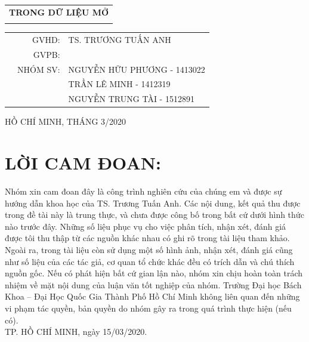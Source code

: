 \documentclass[11pt,a4paper]{article}
\begin{document}
\begin{titlepage}
\begin{center}
\begin{tabular}{c}
    \textbf{{\Huge TRONG DỮ LIỆU MỞ}}\\
	\\
    \hline
\end{tabular}
\end{center}

\vspace{3cm}

\begin{table}[h]
\begin{tabular}{rrl}
\hspace{5 cm} & GVHD: &TS. TRƯƠNG TUẤN ANH\\
& GVPB: & \\
& NHÓM SV: & NGUYỄN HỮU PHƯƠNG - 1413022\\
&   & TRẦN LÊ MINH - 1412319\\
&   & NGUYỄN TRUNG TÀI - 1512891 
\end{tabular}
\end{table}

\vspace{2cm}

\begin{center}
{\footnotesize HỒ CHÍ MINH, THÁNG 3/2020}
\end{center}
\end{titlepage}


\newpage
\section{LỜI CAM ĐOAN:}
Nhóm xin cam đoan đây là công trình nghiên cứu của chúng em và được sự hướng dẫn khoa học của TS. Trương Tuấn Anh. Các nội dung, kết quả thu được trong đề tài này là trung thực, và chưa được công bố trong bất cứ dưới hình thức nào trước đây. Những số liệu phục vụ cho việc phân tích, nhận xét, đánh giá được tôi thu thập từ các nguồn khác nhau có ghi rõ trong tài liệu tham khảo. Ngoài ra, trong tài liệu còn sử dụng một số hình ảnh, nhận xét, đánh giá cũng như số liệu của các tác giả, cơ quan tổ chức khác đều có trích dẫn và chú thích nguồn gốc. Nếu có phát hiện bất cứ gian lận nào, nhóm xin chịu hoàn toàn trách nhiệm về mặt nội dung của luận văn tốt nghiệp của nhóm. Trường Đại học Bách Khoa – Đại Học Quốc Gia Thành Phố Hồ Chí Minh không liên quan đến những vi phạm tác quyền, bản quyền do nhóm gây ra trong quá trình thực hiện (nếu có).
\\

\hspace*{\fill} TP. HỒ CHÍ MINH, ngày 15/03/2020.
\end{document}
